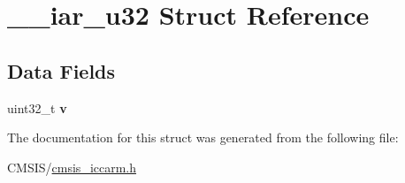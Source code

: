 \hypertarget{struct____iar__u32}{}\section{\+\_\+\+\_\+iar\+\_\+u32 Struct Reference}
\label{struct____iar__u32}
\subsection*{Data Fields}
\begin{DoxyCompactItemize}
\item 
\mbox{\label{struct____iar__u32_a9e0a00edabf3b8a5dafff624fff7bbfc}} 
uint32\+\_\+t {\bfseries v}
\end{DoxyCompactItemize}


The documentation for this struct was generated from the following file\+:\begin{DoxyCompactItemize}
\item 
C\+M\+S\+I\+S/\mbox{\hyperlink{cmsis__iccarm_8h}{cmsis\+\_\+iccarm.\+h}}\end{DoxyCompactItemize}
